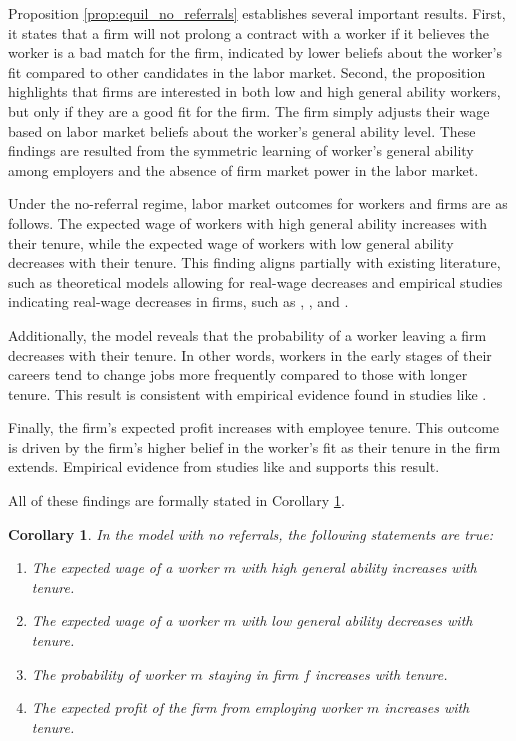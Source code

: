 \documentclass[12pt]{article}
\newtheorem{corollary}[theorem]{Corollary}
\begin{document}
Proposition \ref{prop:equil_no_referrals} establishes several important results. First, it states that a firm will not prolong a contract with a worker if it believes the worker is a bad match for the firm, indicated by lower beliefs about the worker's fit compared to other candidates in the labor market. Second, the proposition highlights that firms are interested in both low and high general ability workers, but only if they are a good fit for the firm. The firm simply adjusts their wage based on labor market beliefs about the worker's general ability level. These findings are resulted from the symmetric learning of worker's general ability among employers and the absence of firm market power in the labor market.

Under the no-referral regime, labor market outcomes for workers and firms are as follows. The expected wage of workers with high general ability increases with their tenure, while the expected wage of workers with low general ability decreases with their tenure. This finding aligns partially with existing literature, such as theoretical models allowing for real-wage decreases \citep{gibbons1999theory} and empirical studies indicating real-wage decreases in firms, such as \cite{mclaughlin1994rigid}, \cite{baker1994internal, baker1994wage}, and \cite{card1997does}.

Additionally, the model reveals that the probability of a worker leaving a firm decreases with their tenure. In other words, workers in the early stages of their careers tend to change jobs more frequently compared to those with longer tenure. This result is consistent with empirical evidence found in studies like \cite{mincer1981labor}.

Finally, the firm's expected profit increases with employee tenure. This outcome is driven by the firm's higher belief in the worker's fit as their tenure in the firm extends. Empirical evidence from studies like \cite{quinones1995relationship} and \cite{ng2010organizational} supports this result.

All of these findings are formally stated in Corollary \ref{cor:results_NR}.

\begin{corollary}\label{cor:results_NR}
    In the model with no referrals, the following statements are true:
    \begin{enumerate}[label={\roman*})]
        \item The expected wage of a worker $m$ with high general ability increases with tenure.
        \item The expected wage of a worker $m$ with low general ability decreases with tenure.
        \item The probability of worker $m$ staying in firm $f$ increases with tenure.
        \item The expected profit of the firm from employing worker $m$ increases with tenure.
    \end{enumerate}
\end{corollary}
\end{document}
